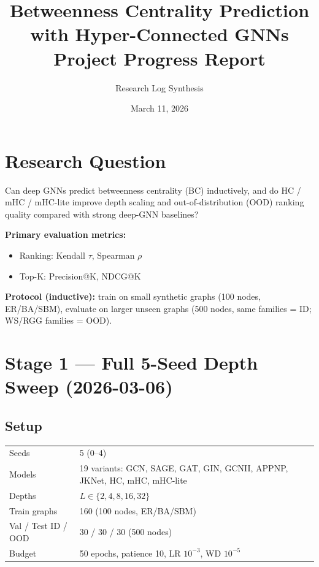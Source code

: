 \documentclass[11pt,a4paper]{article}
\title{%
  \textbf{Betweenness Centrality Prediction with Hyper-Connected GNNs}\\[0.4em]
  \large Project Progress Report
}
\author{Research Log Synthesis}
\date{March 11, 2026}
\begin{document}
\maketitle
\tableofcontents
\newpage

\section{Research Question}

Can deep GNNs predict betweenness centrality (BC) inductively,
and do HC / mHC / mHC-lite improve depth scaling and
out-of-distribution (OOD) ranking quality
compared with strong deep-GNN baselines?

\textbf{Primary evaluation metrics:}
\begin{itemize}[noitemsep]
  \item Ranking: Kendall $\tau$, Spearman $\rho$
  \item Top-K: Precision@K, NDCG@K
\end{itemize}

\textbf{Protocol (inductive):} train on small synthetic graphs
(100 nodes, ER/BA/SBM), evaluate on larger unseen graphs
(500 nodes, same families = ID; WS/RGG families = OOD).

\section{Stage 1 --- Full 5-Seed Depth Sweep (2026-03-06)}

\subsection{Setup}
\begin{table}[h]
\centering
\begin{tabular}{L{4.5cm} L{7.5cm}}
\toprule
Seeds & 5 (0--4) \\
Models & 19 variants: GCN, SAGE, GAT, GIN, GCNII, APPNP, JKNet,
         HC, mHC, mHC-lite \\
Depths & $L \in \{2,4,8,16,32\}$ \\
Train graphs & 160 (100 nodes, ER/BA/SBM) \\
Val / Test ID / OOD & 30 / 30 / 30 (500 nodes) \\
Budget & 50 epochs, patience 10, LR $10^{-3}$, WD $10^{-5}$ \\
\bottomrule
\end{tabular}
\end{table}
\end{document}

